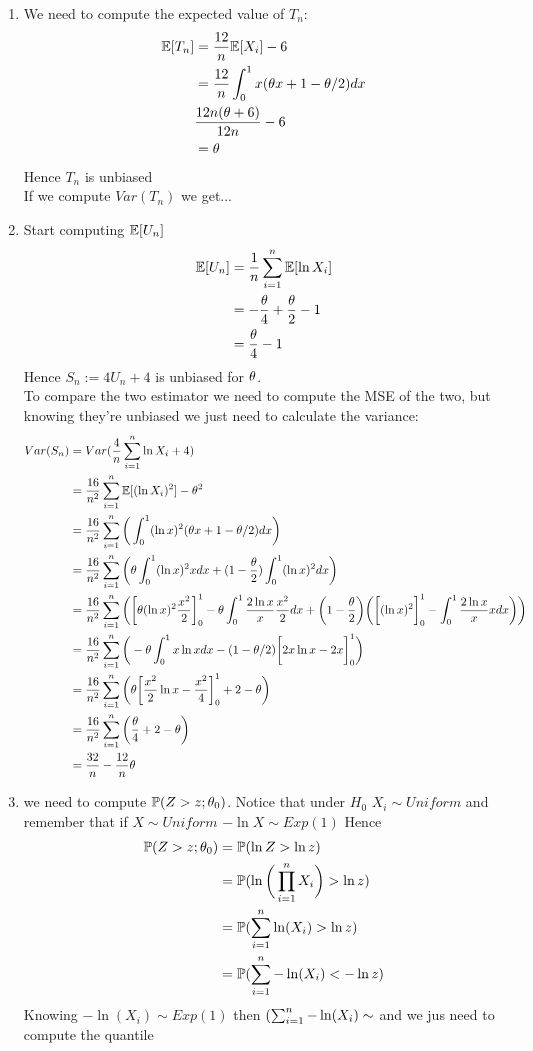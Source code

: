 \begin{enumerate}
	\item We need to compute the expected value of $T_n$:
	\[
	\begin{split}
	\mathbb{E}[T_n]&=\frac{12}{n}\mathbb{E}[X_i]-6\\&=\frac{12}{n}\int_{0}^{1} x(\theta x +1 - \theta/2)dx\\&	\frac{12n(\theta+6)}{12n}-6\\&=\theta
	\end{split}
	\]
	Hence $T_n$ is unbiased\\
	If we compute $Var(T_n)$ we get...
	\item Start computing $\mathbb{E}[U_n]$
	\[
	\begin{split}
	\mathbb{E}[U_n]&=
	\frac{1}{n}\sum_{i=1}^n \mathbb{E}[\ln X_i]\\&=-\frac{\theta}{4}+\frac{\theta}{2}-1\\&=\frac{\theta}{4}-1
	\end{split}
	\]
	Hence $S_n:=4U_n +4$ is unbiased for $\theta$.\\
	To compare the two estimator we need to compute the MSE of the two, but knowing they're unbiased we just need to calculate the variance:
	\[
	\begin{split}
	Var(S_n)&=Var(\frac{4}{n}\sum_{i=1}^n \ln X_i+4)\\
	&=\frac{16}{n^2}\sum_{i=1}^n \mathbb{E}[(\ln X_i)^2]- \theta^2\\
	&=\frac{16}{n^2}\sum_{i=1}^n \bigg(\int_{0}^{1} (\ln x)^2(\theta x +1 - \theta/2)dx \bigg)\\
	&=\frac{16}{n^2}\sum_{i=1}^n \bigg(\theta \int_{0}^{1} (\ln x)^2x dx +(1-\frac{\theta}{2})\int_{0}^{1} (\ln x)^2 dx \bigg)\\
	&=\frac{16}{n^2}\sum_{i=1}^n \bigg( \bigg[\theta (\ln x)^2 \frac{x^2}{2} \bigg]_0^1 -\theta \int_{0}^{1} \frac{2 \ln x}{x} \frac{x^2}{2}dx +\bigg(1-\frac{\theta}{2}\bigg)\bigg( \bigg[ (\ln x)^2  \bigg]_0^1 -\int_{0}^{1} \frac{2 \ln x}{x} x dx \bigg)   \bigg)\\
	&=\frac{16}{n^2}\sum_{i=1}^n \bigg( -\theta \int_{0}^{1}x \ln x dx -(1- \theta/2)\bigg[2x\ln x -2x \bigg]_0^1 \bigg)\\
	&=\frac{16}{n^2}\sum_{i=1}^n \bigg( \theta\bigg[\frac{x^2}{2}\ln x -\frac{x^2}{4}\bigg]_0^1 +2-\theta \bigg)\\
	&=\frac{16}{n^2}\sum_{i=1}^n \bigg( \frac{\theta}{4} +2 -\theta \bigg)\\
	&=\frac{32}{n}-\frac{12}{n}\theta
	\end{split}
	\]
	\item we need to compute $\mathbb{P}(Z>z ;\theta_0)$. Notice that under $H_0$ $X_i\sim Uniform$ and remember that if $X\sim Uniform$ $-\ln X \sim Exp (1)$ Hence
	\[
	\begin{split}
	\mathbb{P}(Z>z ;\theta_0)
	&=\mathbb{P}(\ln Z> \ln z)\\
	&=\mathbb{P}(\ln\bigg(\prod_{i=1}^{n}X_i\bigg)> \ln z)\\
	&=\mathbb{P}(\sum_{i=1}^n \ln(X_i)> \ln z)\\
	&=\mathbb{P}(\sum_{i=1}^n - \ln(X_i)<-\ln z)
	\end{split}
	\]
	Knowing $ - \ln(X_i)\sim Exp(1)$ then $(\sum_{i=1}^n - \ln(X_i) \sim $ and we jus need to compute the quantile
\end{enumerate}
